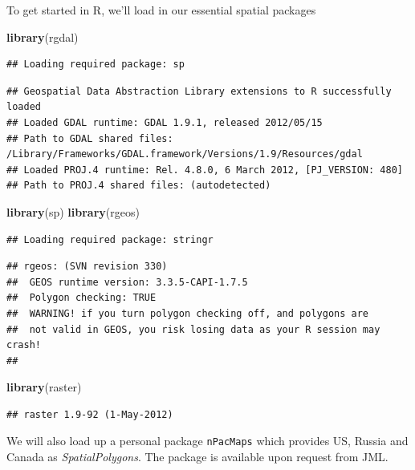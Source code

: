 \documentclass[]{article}
\newenvironment{Shaded}{}{}
\newcommand{\KeywordTok}[1]{\textcolor[rgb]{0.00,0.44,0.13}{\textbf{{#1}}}}
\newcommand{\NormalTok}[1]{{#1}}
\begin{document}
To get started in R, we'll load in our essential spatial packages

\begin{Shaded}
\begin{Highlighting}[]
\KeywordTok{library}\NormalTok{(rgdal)}
\end{Highlighting}
\end{Shaded}
\begin{verbatim}
## Loading required package: sp
\end{verbatim}

\begin{verbatim}
## Geospatial Data Abstraction Library extensions to R successfully loaded
## Loaded GDAL runtime: GDAL 1.9.1, released 2012/05/15
## Path to GDAL shared files: /Library/Frameworks/GDAL.framework/Versions/1.9/Resources/gdal
## Loaded PROJ.4 runtime: Rel. 4.8.0, 6 March 2012, [PJ_VERSION: 480]
## Path to PROJ.4 shared files: (autodetected)
\end{verbatim}

\begin{Shaded}
\begin{Highlighting}[]
\KeywordTok{library}\NormalTok{(sp)}
\KeywordTok{library}\NormalTok{(rgeos)}
\end{Highlighting}
\end{Shaded}
\begin{verbatim}
## Loading required package: stringr
\end{verbatim}

\begin{verbatim}
## rgeos: (SVN revision 330)
##  GEOS runtime version: 3.3.5-CAPI-1.7.5 
##  Polygon checking: TRUE 
##  WARNING! if you turn polygon checking off, and polygons are
##  not valid in GEOS, you risk losing data as your R session may crash! 
## 
\end{verbatim}

\begin{Shaded}
\begin{Highlighting}[]
\KeywordTok{library}\NormalTok{(raster)}
\end{Highlighting}
\end{Shaded}
\begin{verbatim}
## raster 1.9-92 (1-May-2012)
\end{verbatim}

We will also load up a personal package \texttt{nPacMaps} which provides
US, Russia and Canada as \emph{SpatialPolygons}. The package is
available upon request from JML.
\end{document}

